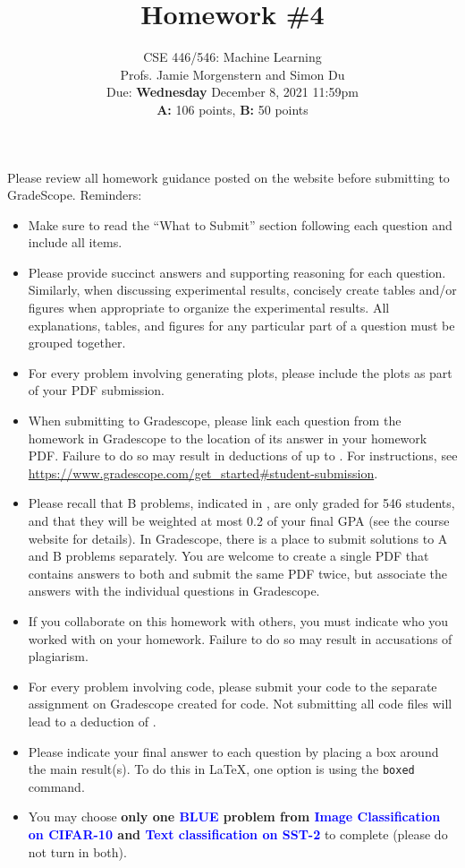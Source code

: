 \documentclass{article}
\begin{document}
\setcounter{aprob}{0}
\setcounter{bprob}{0}
\title{Homework \#4}
\author{
    \normalsize{CSE 446/546: Machine Learning}\\
    \normalsize{Profs. Jamie Morgenstern and Simon Du}\\
    \normalsize{Due: \textbf{Wednesday} December 8, 2021 11:59pm}\\
    \normalsize{\textbf{A:} 106 points, \textbf{B:} 50 points}
}
\date{{}}
\maketitle

\noindent Please review all homework guidance posted on the website before submitting to GradeScope. Reminders:
\begin{itemize}
    \item Make sure to read the ``What to Submit'' section following each question and include all items.
    \item Please provide succinct answers and supporting reasoning for each question. Similarly, when discussing experimental results, concisely create tables and/or figures when appropriate to organize the experimental results. All explanations, tables, and figures for any particular part of a question must be grouped together. 
    \item For every problem involving generating plots, please include the plots as part of your PDF submission.
    \item When submitting to Gradescope, please link each question from the homework in Gradescope to the location of its answer in your homework PDF. Failure to do so may result in deductions of up to . For instructions, see \url{https://www.gradescope.com/get_started#student-submission}.
    \item Please recall that B problems, indicated in , are only graded for 546 students, and that they will be weighted at most 0.2 of your final GPA (see the course website for details). In Gradescope, there is a place to submit solutions to A and B problems separately. You are welcome to create a single PDF that contains answers to both and submit the same PDF twice, but associate the answers with the individual questions in Gradescope. 
    \item If you collaborate on this homework with others, you must indicate who you worked with on your homework. Failure to do so may result in accusations of plagiarism.
    \item For every problem involving code, please submit your code to the separate assignment on Gradescope created for code. Not submitting all code files will lead to a deduction of .
    \item Please indicate your final answer to each question by placing a box around the main result(s). To do this in \LaTeX, one option is using the \texttt{boxed} command.
    \item You may choose \textbf{only one \textcolor{blue}{BLUE} problem from \textcolor{blue}{Image Classification on CIFAR-10} and \textcolor{blue}{Text classification on SST-2}} to complete (please do not turn in both).
\end{itemize}
\end{document}
